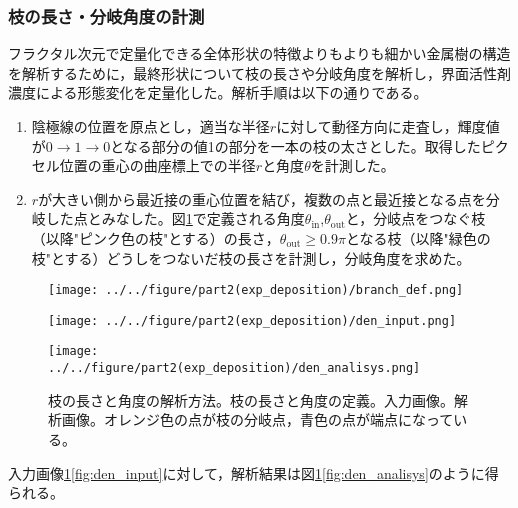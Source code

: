 \documentclass[autodetect-engine,dvi=dvipdfmx,a4paper,ja=standard,oneside,openany,11pt,draft]{bxjsbook}
\begin{document}
\subsubsection{枝の長さ・分岐角度の計測}
フラクタル次元で定量化できる全体形状の特徴よりもよりも細かい金属樹の構造を解析するために，最終形状について枝の長さや分岐角度を解析し，界面活性剤濃度による形態変化を定量化した。解析手順は以下の通りである。
\begin{enumerate}
  \item 陰極線の位置を原点とし，適当な半径$r$に対して動径方向に走査し，輝度値が$0\rightarrow1\rightarrow0$となる部分の値1の部分を一本の枝の太さとした。取得したピクセル位置の重心の曲座標上での半径$r$と角度$\theta$を計測した。
  \item $r$が大きい側から最近接の重心位置を結び，複数の点と最近接となる点を分岐した点とみなした。図\ref{fig:branch_def_input}で定義される角度$\theta_{\mathrm{in}}$,$\theta_{\mathrm{out}}$と，分岐点をつなぐ枝（以降"ピンク色の枝"とする）の長さ，$\theta_{\mathrm{out}}\geq 0.9\pi$となる枝（以降"緑色の枝"とする）どうしをつないだ枝の長さを計測し，分岐角度を求めた。
\end{enumerate}
\begin{figure}
  \begin{minipage}
    {0.32\textwidth}
    \subcaption{}
    \centering
    \texttt{[image: ../../figure/part2(exp\_deposition)/branch\_def.png]}
    \label{fig:branch_def}
  \end{minipage}
  \begin{minipage}
    {0.32\textwidth}
    \subcaption{}
    \centering
    \texttt{[image: ../../figure/part2(exp\_deposition)/den\_input.png]}
    \label{fig:den_input}
  \end{minipage}
  \begin{minipage}
    {0.32\textwidth}
    \subcaption{}
    \centering
    \texttt{[image: ../../figure/part2(exp\_deposition)/den\_analisys.png]}
    \label{fig:den_analisys}
  \end{minipage}
  \label{fig:branch_def_input}
  \caption{枝の長さと角度の解析方法。枝の長さと角度の定義。入力画像。解析画像。オレンジ色の点が枝の分岐点，青色の点が端点になっている。}
\end{figure}
入力画像\ref{fig:branch_def_input}\ref{fig:den_input}に対して，解析結果は図\ref{fig:branch_def_input}\ref{fig:den_analisys}のように得られる。
\end{document}
